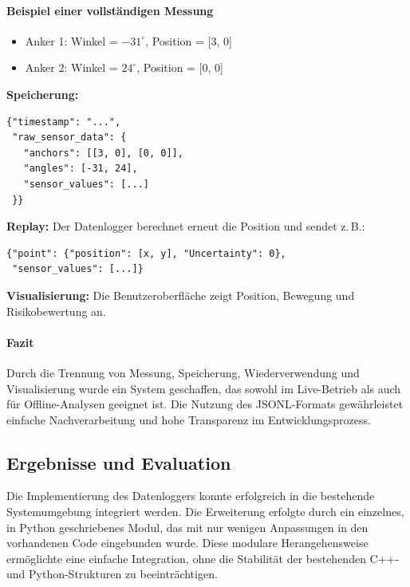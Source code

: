 \documentclass[a4paper, 12pt]{article} %
\begin{document}
\paragraph{Beispiel einer vollständigen Messung}

\begin{itemize}
    \item Anker 1: Winkel = \(-31^\circ\), Position = [3, 0]
    \item Anker 2: Winkel = \(24^\circ\), Position = [0, 0]
\end{itemize}

\textbf{Speicherung:}
\begin{verbatim}
{"timestamp": "...", 
 "raw_sensor_data": {
   "anchors": [[3, 0], [0, 0]], 
   "angles": [-31, 24], 
   "sensor_values": [...]
 }}
\end{verbatim}

\textbf{Replay:}  
Der Datenlogger berechnet erneut die Position und sendet z.\,B.:

\begin{verbatim}
{"point": {"position": [x, y], "Uncertainty": 0}, 
 "sensor_values": [...]}
\end{verbatim}

\textbf{Visualisierung:}  
Die Benutzeroberfläche zeigt Position, Bewegung und Risikobewertung an.

\paragraph{Fazit}

Durch die Trennung von Messung, Speicherung, Wiederverwendung und Visualisierung wurde ein System geschaffen, 
das sowohl im Live-Betrieb als auch für Offline-Analysen geeignet ist. Die Nutzung des \ac{JSONL}-Formats gewährleistet einfache 
Nachverarbeitung und hohe Transparenz im Entwicklungsprozess.

\subsection{Ergebnisse und Evaluation}

Die Implementierung des Datenloggers konnte erfolgreich in die bestehende Systemumgebung integriert werden. Die Erweiterung 
erfolgte durch ein einzelnes, in Python geschriebenes Modul, das mit nur wenigen Anpassungen in den vorhandenen Code eingebunden wurde. 
Diese modulare Herangehensweise ermöglichte eine einfache Integration, ohne die Stabilität der bestehenden C++- und Python-Strukturen zu beeinträchtigen.
\end{document}

